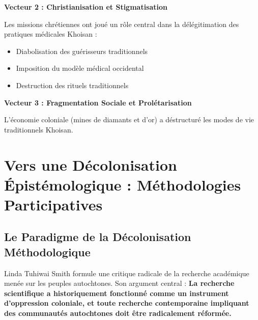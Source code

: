 \documentclass[12pt,a4paper]{report}
\begin{document}
\textbf{Vecteur 2 : Christianisation et Stigmatisation}

Les missions chrétiennes ont joué un rôle central dans la délégitimation des pratiques médicales Khoisan :
\begin{itemize}
\item Diabolisation des guérisseurs traditionnels
\item Imposition du modèle médical occidental
\item Destruction des rituels traditionnels
\end{itemize}

\textbf{Vecteur 3 : Fragmentation Sociale et Prolétarisation}

L'économie coloniale (mines de diamants et d'or) a déstructuré les modes de vie traditionnels Khoisan.

\section{Vers une Décolonisation Épistémologique : Méthodologies Participatives}

\subsection{Le Paradigme de la Décolonisation Méthodologique}

Linda Tuhiwai Smith \cite{Smith1999} formule une critique radicale de la recherche académique menée sur les peuples autochtones. Son argument central : \textbf{La recherche scientifique a historiquement fonctionné comme un instrument d'oppression coloniale, et toute recherche contemporaine impliquant des communautés autochtones doit être radicalement réformée.}
\end{document}

